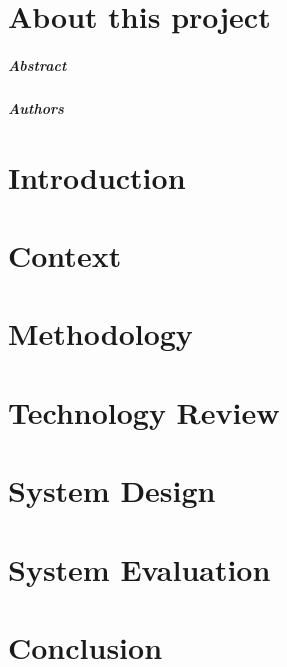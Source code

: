 
\chapter*{About this project}

\paragraph{Abstract}

\paragraph{Authors}

\chapter{Introduction}

\chapter{Context}

\chapter{Methodology}

\chapter{Technology Review}

\chapter{System Design}

\chapter{System Evaluation}

\chapter{Conclusion}


